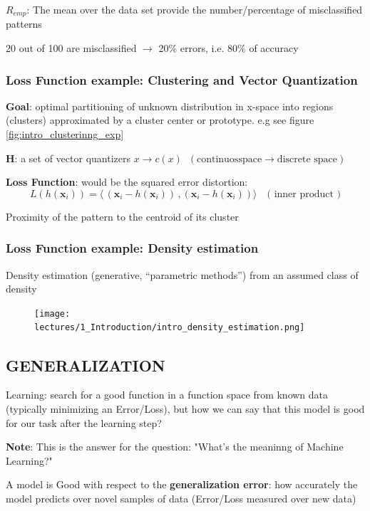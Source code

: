 \documentclass[../main.tex]{subfiles}
\begin{document}
\begin{center}
    $R_{emp}$: The mean over the data set provide the number/percentage of misclassified patterns
\end{center}
\begin{example}
    20 out of 100 are misclassified $\rightarrow$ 20\% errors, i.e. 80\% of accuracy
\end{example}

\subsubsection{Loss Function example: Clustering and Vector Quantization}
\textbf{Goal}: optimal partitioning of unknown distribution in x-space into regions (clusters) approximated by a cluster center or prototype. e.g see figure \ref{fig:intro_clusterinng_exp}

\noindent \textbf{H}: a set of vector quantizers $ x \rightarrow c(x) \;\;( \text{continuosspace} \rightarrow \text{discrete space})$

\noindent \textbf{Loss Function}: would be the squared error distortion:
$$L(h(\textbf{x}_{i})) = \langle\,(\mathbf{x}_i - h(\mathbf{x}_i))\,, (\mathbf{x}_i - h(\mathbf{x}_i))\rangle \quad \text{( inner product )}$$

Proximity of the pattern to the centroid of its cluster

\subsubsection{Loss Function example: Density estimation}
Density estimation (generative, “parametric methods”) from an assumed class of density
\begin{figure}[H]
    \centering
    \texttt{[image: lectures/1\_Introduction/intro\_density\_estimation.png]}
\end{figure}



\subsection{GENERALIZATION}
Learning: search for a good function in a function space from known data (typically minimizing an Error/Loss), but how we can say that this model is good for our task after the learning step?

\textbf{Note}: This is the answer for the question: "What's the meaninng of Machine Learning?"
\begin{center}
    A model is Good with respect to the \textbf{generalization error}: how accurately the model predicts over novel samples of data (Error/Loss measured over new data) 
\end{center}
\end{document}
